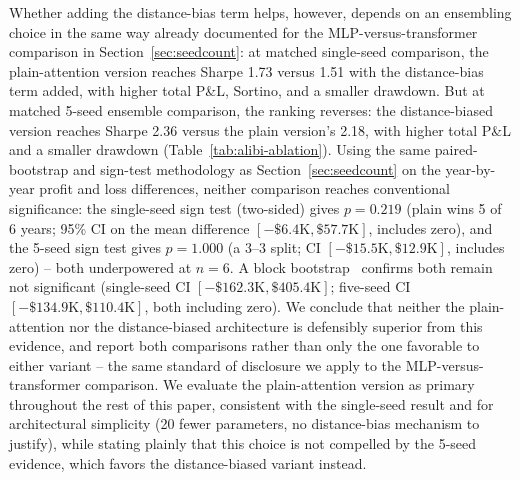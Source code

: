 \documentclass[sigconf,review,anonymous]{acmart}
\begin{document}
Whether adding the distance-bias term helps, however, depends on an ensembling choice in the same way already documented for the MLP-versus-transformer comparison in Section~\ref{sec:seedcount}: at matched single-seed comparison, the plain-attention version reaches Sharpe 1.73 versus 1.51 with the distance-bias term added, with higher total P\&L, Sortino, and a smaller drawdown. But at matched 5-seed ensemble comparison, the ranking reverses: the distance-biased version reaches Sharpe 2.36 versus the plain version's 2.18, with higher total P\&L and a smaller drawdown (Table~\ref{tab:alibi-ablation}). Using the same paired-bootstrap and sign-test methodology as Section~\ref{sec:seedcount} on the year-by-year profit and loss differences, neither comparison reaches conventional significance: the single-seed sign test (two-sided) gives $p=0.219$ (plain wins 5 of 6 years; 95\% CI on the mean difference $[-\$6.4\text{K}, \$57.7\text{K}]$, includes zero), and the 5-seed sign test gives $p=1.000$ (a 3--3 split; CI $[-\$15.5\text{K}, \$12.9\text{K}]$, includes zero) -- both underpowered at $n=6$. A block bootstrap~\cite{kunsch1989} confirms both remain not significant (single-seed CI $[-\$162.3\text{K}, \$405.4\text{K}]$; five-seed CI $[-\$134.9\text{K}, \$110.4\text{K}]$, both including zero). We conclude that neither the plain-attention nor the distance-biased architecture is defensibly superior from this evidence, and report both comparisons rather than only the one favorable to either variant -- the same standard of disclosure we apply to the MLP-versus-transformer comparison. We evaluate the plain-attention version as primary throughout the rest of this paper, consistent with the single-seed result and for architectural simplicity (20 fewer parameters, no distance-bias mechanism to justify), while stating plainly that this choice is not compelled by the 5-seed evidence, which favors the distance-biased variant instead.

\begin{table}[t]
\centering
\footnotesize
{}
\caption{Matched seed-count comparison, identical protocol otherwise (same features, folds, val-loss checkpointing, calibration, and $p\ge0.5$ selection rule): plain attention wins at single-seed, the distance-biased variant wins at 5-seed ensemble, and neither difference is statistically significant (main text).}
\label{tab:alibi-ablation}
\end{table}
\end{document}
